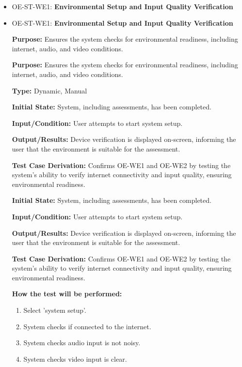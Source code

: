 \documentclass[12pt, titlepage]{article}
\begin{document}
\begin{itemize}
  \item OE-ST-WE1: \textbf{Environmental Setup and Input Quality Verification}

  \item OE-ST-WE1: \textbf{Environmental Setup and Input Quality Verification}
  \begin{mdframed}[linewidth=0.5mm]
      \textbf{Purpose:} Ensures the system checks for environmental readiness, including \\ internet, audio, and video conditions. \par
      \textbf{Purpose:} Ensures the system checks for environmental readiness, including \\ internet, audio, and video conditions. \par
      \textbf{Type:} Dynamic, Manual \par
      \textbf{Initial State:} System, including assessments, has been completed. \par
      \textbf{Input/Condition:} User attempts to start system setup. \par
      \textbf{Output/Results:} Device verification is displayed on-screen, informing the user that the environment is suitable for the assessment. \par
      \textbf{Test Case Derivation:} Confirms OE-WE1 and OE-WE2 by testing the system’s ability to verify internet connectivity and input quality, ensuring environmental readiness. \par
      \textbf{Initial State:} System, including assessments, has been completed. \par
      \textbf{Input/Condition:} User attempts to start system setup. \par
      \textbf{Output/Results:} Device verification is displayed on-screen, informing the user that the environment is suitable for the assessment. \par
      \textbf{Test Case Derivation:} Confirms OE-WE1 and OE-WE2 by testing the system’s ability to verify internet connectivity and input quality, ensuring environmental readiness. \par
      \textbf{How the test will be performed:}
      \begin{enumerate}[noitemsep]
        \item Select 'system setup'.
        \item System checks if connected to the internet.
        \item System checks audio input is not noisy.
        \item System checks video input is clear.

\end{enumerate}
\end{mdframed}
\end{itemize}
\end{document}
